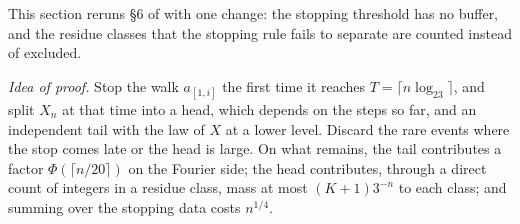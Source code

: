 \documentclass[11pt]{amsart}
\theoremstyle{remark}
\newcommand{\Tc}{\cite{Tao22}}         %
\theoremstyle{plain}
\begin{document}
This section reruns \S6 of \Tc{} with one change: the stopping threshold has no buffer, and the residue classes that the stopping rule fails to separate are counted instead of excluded.

\emph{Idea of proof.} Stop the walk $a_{[1,i]}$ the first time it reaches $T=\lceil n\log_23\rceil$, and split $X_n$ at that time into a head, which depends on the steps so far, and an independent tail with the law of $X$ at a lower level. Discard the rare events where the stop comes late or the head is large. On what remains, the tail contributes a factor $\Phi(\lceil n/20\rceil)$ on the Fourier side; the head contributes, through a direct count of integers in a residue class, mass at most $(K+1)3^{-n}$ to each class; and summing over the stopping data costs $n^{1/4}$.
\end{document}
